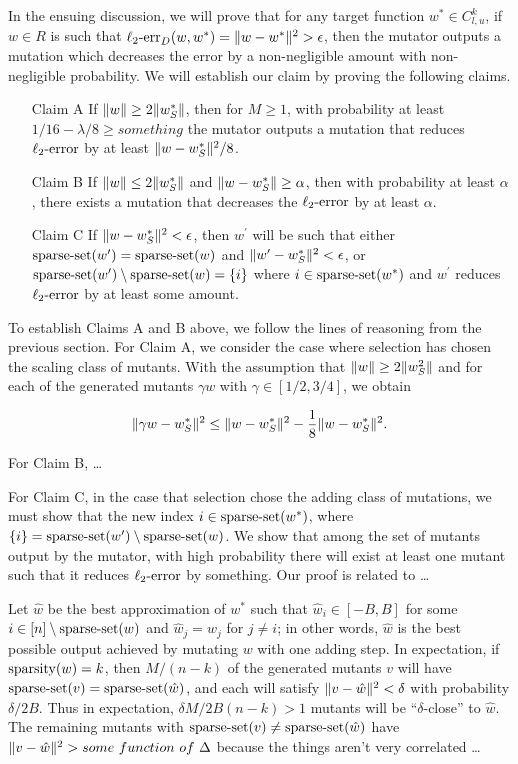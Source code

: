 In the ensuing discussion, we will prove that for any target function
$w^* \in C^k_{l,u}$, if $w \in R$ is such that
$\mathrm{\ell_2\mbox{-}err}_D(w, w^*) = \Vert w - w^* \Vert^2 > \epsilon$,
then the mutator outputs a mutation which decreases the error by a
non-negligible amount with non-negligible probability.
We will establish our claim by proving the following claims.

\begin{enumerate}
\item[Claim A] If $\Vert w \Vert \ge 2 \Vert w^*_S \Vert$, then for $M \ge 1$,
with probability at least $1/16 - \lambda/8 \ge something$ the mutator outputs
a mutation that reduces $\mathrm{\ell_2\mbox{-}error}$ by at least $\Vert w - w^*_S \Vert^2 / 8$.
\item[Claim B] If $\Vert w \Vert \le 2 \Vert w^*_S \Vert$ and
$\Vert w - w^*_S \Vert \ge \alpha$, then with probability at least $\alpha$,
there exists a mutation that decreases the $\mathrm{\ell_2\mbox{-}error}$ by at least $\alpha$.
\item[Claim C] If $\Vert w - w^*_S \Vert^2 < \epsilon$, then $w^\prime$ will be
such that either $\mathrm{sparse\mbox{-}set}(w^\prime) = \mathrm{sparse\mbox{-}set}(w)$ and
$\Vert w^\prime - w^*_S \Vert^2 < \epsilon$, or
$\mathrm{sparse\mbox{-}set}(w^\prime) \setminus \mathrm{sparse\mbox{-}set}(w) = \{i\}$ where $i \in \mathrm{sparse\mbox{-}set}(w^*)$
and $w^\prime$ reduces $\mathrm{\ell_2\mbox{-}error}$ by at least some amount.
\end{enumerate}

To establish Claims A and B above, we follow the lines of reasoning from the
previous section.
For Claim A, we consider the case where selection has chosen the scaling class
of mutants.  With the assumption that $\Vert w \Vert \ge 2 \Vert w_S^2 \Vert$ and
for each of the generated mutants $\gamma w$ with $\gamma \in [1/2, 3/4]$,
we obtain

\[
\Vert \gamma w - w^*_S \Vert^2 \le \Vert w - w^*_S \Vert^2 - \frac{1}{8}\Vert w - w^*_S \Vert^2.
\]

For Claim B, \dots

For Claim C, in the case that selection chose the adding class of mutations,
we must show that the new index $i \in \mathrm{sparse\mbox{-}set}(w^*)$, where
$\{i\} = \mathrm{sparse\mbox{-}set}(w^\prime) \setminus \mathrm{sparse\mbox{-}set}(w)$.
We show that among the set of mutants output by the mutator, with high probability
there will exist at least one mutant such that it reduces $\mathrm{\ell_2\mbox{-}error}$ by something.
Our proof is related to \dots

Let $\hat{w}$ be the best approximation of $w^*$ such that $\hat{w}_i \in [-B, B]$
for some $i \in [n] \setminus \mathrm{sparse\mbox{-}set}(w)$ and $\hat{w}_j = w_j$ for $j \neq i$;
in other words, $\hat{w}$ is the best possible output achieved by mutating $w$ with
one adding step.
In expectation, if $\mathrm{sparsity}(w) = k$, then $M / (n - k)$ of the generated mutants
$v$ will have $\mathrm{sparse\mbox{-}set}(v) = \mathrm{sparse\mbox{-}set}(\hat{w})$, and each will satisfy
$\Vert v - \hat{w} \Vert^2 < \delta$ with probability $\delta/2B$.
Thus in expectation, $\delta M / 2B(n - k) > 1$ mutants will be
``$\delta$-close'' to $\hat{w}$.
The remaining mutants with $\mathrm{sparse\mbox{-}set}(v) \neq \mathrm{sparse\mbox{-}set}(\hat{w})$ have
$\Vert v - \hat{w} \Vert^2 > some~function~of~\Delta$
because the things aren't very correlated \dots


